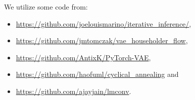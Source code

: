 \documentclass{article}
\begin{document}
We utilize some code from:
\begin{itemize}
\item \url{https://github.com/joelouismarino/iterative_inference/}, 
\item \url{https://github.com/jmtomczak/vae_householder_flow}, 
\item \url{https://github.com/AntixK/PyTorch-VAE}, 
\item \url{https://github.com/haofuml/cyclical_annealing} and 
\item \url{https://github.com/ajayjain/lmconv}. 
\end{itemize}







\end{document}
